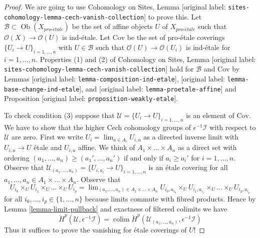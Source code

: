 \documentclass[10pt,a4paper]{article}
\theoremstyle{plain}
\theoremstyle{definition}
\theoremstyle{remark}
\numberwithin{equation}{subsection}
\def\lim{\mathop{\mathrm{lim}}\nolimits}
\def\colim{\mathop{\mathrm{colim}}\nolimits}
\def\Ob{\mathop{\mathrm{Ob}}\nolimits}
\def\proetale{{pro\text{-}\acute{e}tale}}
\begin{document}
\begin{proof}
We are going to use
Cohomology on Sites, Lemma [original label: \nolinkurl{sites-cohomology-lemma-cech-vanish-collection}]
to prove this. Let $\mathcal{B} \subset \Ob(X_\proetale)$ be the set of affine
objects $U$ of $X_\proetale$ such that $\mathcal{O}(X) \to \mathcal{O}(U)$ is
ind-\'etale. Let $\text{Cov}$ be the set of pro-\'etale coverings
$\{U_i \to U\}_{i = 1, \ldots, n}$ with $U \in \mathcal{B}$ such that
$\mathcal{O}(U) \to \mathcal{O}(U_i)$ is ind-\'etale for $i = 1, \ldots, n$.
Properties (1) and (2) of
Cohomology on Sites, Lemma [original label: \nolinkurl{sites-cohomology-lemma-cech-vanish-collection}]
hold for $\mathcal{B}$ and $\text{Cov}$ by
Lemmas [original label: \nolinkurl{lemma-composition-ind-etale}],
[original label: \nolinkurl{lemma-base-change-ind-etale}], and
[original label: \nolinkurl{lemma-proetale-affine}] and
Proposition [original label: \nolinkurl{proposition-weakly-etale}].

\medskip\noindent
To check condition (3) suppose that
$\mathcal{U} = \{U_i \to U\}_{i = 1, \ldots, n}$
is an element of $\text{Cov}$. We have to show that the higher
Cech cohomology groups of $\epsilon^{-1}\mathcal{I}$
with respect to $\mathcal{U}$ are zero.
First we write $U_i = \lim_{a \in A_i} U_{i, a}$ as a directed inverse limit
with $U_{i, a} \to U$ \'etale and $U_{i, a}$ affine.
We think of $A_1 \times \ldots \times A_n$ as a direct set
with ordering $(a_1, \ldots, a_n) \geq (a_1', \ldots, a_n')$
if and only if $a_i \geq a_i'$ for $i = 1, \ldots, n$.
Observe that
$\mathcal{U}_{(a_1, \ldots, a_n)} = \{U_{i, a_i} \to U\}_{i = 1, \ldots, n}$
is an \'etale covering for all
$a_1, \ldots, a_n \in A_1 \times \ldots \times A_n$.
Observe that
$$
U_{i_0} \times_U U_{i_1} \times_U \ldots \times_U U_{i_p}
=
\lim_{(a_1, \ldots, a_n) \in A_1 \times \ldots \times A_n}
U_{i_0, a_{i_0}} \times_U
U_{i_1, a_{i_1}} \times_U \ldots \times_U U_{i_p, a_{i_p}}
$$
for all $i_0, \ldots, i_p \in \{1, \ldots, n\}$ because limits
commute with fibred products. Hence by Lemma \ref{lemma-limit-pullback}
and exactness of filtered colimits we have
$$
\check{H}^p(\mathcal{U}, \epsilon^{-1}\mathcal{I}) =
\colim \check{H}^p(\mathcal{U}_{(a_1, \ldots, a_n)}, \epsilon^{-1}\mathcal{I}) 
$$
Thus it suffices to prove the vanishing for \'etale coverings
of $U$!


\end{proof}
\end{document}
